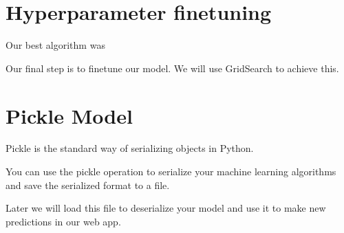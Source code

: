 \documentclass[letterpaper,10pt,english]{jupyterBook}
\begin{document}
\section{Hyperparameter finetuning}
\label{\detokenize{Model_evaluation:hyperparameter-finetuning}}
\sphinxAtStartPar
Our best algorithm was

\sphinxAtStartPar
Our final step is to fine\sphinxhyphen{}tune our model. We will use GridSearch to achieve this.


\section{Pickle Model}
\label{\detokenize{Model_evaluation:pickle-model}}
\sphinxAtStartPar
Pickle is the standard way of serializing objects in Python.

\sphinxAtStartPar
You can use the pickle operation to serialize your machine learning algorithms and save the serialized format to a file.

\sphinxAtStartPar
Later we will load this file to deserialize your model and use it to make new predictions in our web app.
\end{document}
